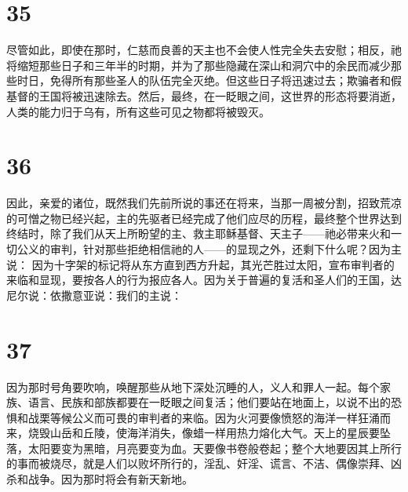 
\section{35}

尽管如此，即使在那时，仁慈而良善的天主也不会使人性完全失去安慰；相反，祂将缩短那些日子和三年半的时期，并为了那些隐藏在深山和洞穴中的余民而减少那些时日，免得所有那些圣人的队伍完全灭绝。但这些日子将迅速过去；欺骗者和假基督的王国将被迅速除去。然后，最终，在一眨眼之间，这世界的形态将要消逝，人类的能力归于乌有，所有这些可见之物都将被毁灭。\par


\section{36}

因此，亲爱的诸位，既然我们先前所说的事还在将来，当那一周被分割，招致荒凉的可憎之物已经兴起，主的先驱者已经完成了他们应尽的历程，最终整个世界达到终结时，除了我们从天上所盼望的主、救主耶稣基督、天主子——祂必带来火和一切公义的审判，针对那些拒绝相信祂的人——的显现之外，还剩下什么呢？因为主说： 因为十字架的标记将从东方直到西方升起，其光芒胜过太阳，宣布审判者的来临和显现，要按各人的行为报应各人。因为关于普遍的复活和圣人们的王国，达尼尔说：依撒意亚说：我们的主说：\par


\section{37}

因为那时号角要吹响，唤醒那些从地下深处沉睡的人，义人和罪人一起。每个家族、语言、民族和部族都要在一眨眼之间复活；他们要站在地面上，以说不出的恐惧和战栗等候公义而可畏的审判者的来临。因为火河要像愤怒的海洋一样狂涌而来，烧毁山岳和丘陵，使海洋消失，像蜡一样用热力熔化大气。天上的星辰要坠落，太阳要变为黑暗，月亮要变为血。天要像书卷般卷起；整个大地要因其上所行的事而被烧尽，就是人们以败坏所行的，淫乱、奸淫、谎言、不洁、偶像崇拜、凶杀和战争。因为那时将会有新天新地。\par

